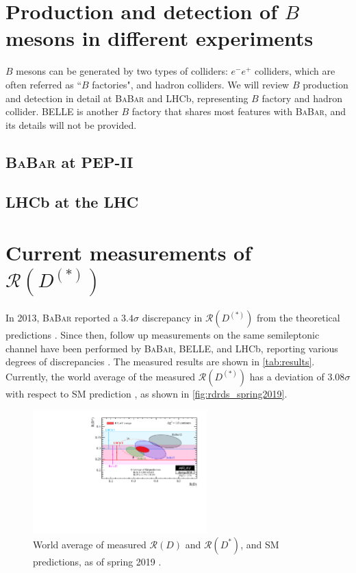 \documentclass[12pt,letterpaper]{article}
\def\BaBar/{\textsc{BaBar}}
\def\RD/{\ensuremath{\mathcal{R}(D)}}
\def\RDst/{\ensuremath{\mathcal{R}(D^{*})}}
\def\RDDst/{\ensuremath{\mathcal{R}(D^{(*)})}}
\begin{document}
\section{Production and detection of $B$ mesons in different experiments}
$B$ mesons can be generated by two types of colliders:
$e^- e^+$ colliders, which are often referred as ``$B$ factories", and hadron colliders.
We will review $B$ production and detection in detail at \BaBar/ and LHCb, representing $B$ factory and hadron collider.
BELLE is another $B$ factory that shares most features with \BaBar/, and its details will not be provided.

\subsection{\BaBar/ at PEP-II} \label{sec:babar}


\subsection{LHCb at the LHC} \label{sec:lhcb}


\section{Current measurements of \RDDst/}
In 2013, \BaBar/ reported a $3.4\sigma$ discrepancy in \RDDst/ from the
theoretical predictions \cite{Lees:2013rw}.
Since then, follow up measurements on the same semileptonic channel have been
performed by \BaBar/, BELLE, and LHCb, reporting various degrees of
discrepancies \cite{Hirose:2017185, LHCb:PhysRevLett.115.111803, Aaij:2017deq}.
The measured results are shown in \autoref{tab:results}.
Currently, the world average of the measured \RDDst/ has a deviation of
$3.08\sigma$ with respect to SM prediction \cite{HFLAV:2019}, as shown
in \autoref{fig:rdrds_spring2019}.

\begin{figure}[ht]
    \centering
    \includegraphics[width=0.6\textwidth]{figs/rdrds_spring2019.pdf}
    \caption{
        World average of measured \RD/ and \RDst/, and SM predictions, as of
        spring 2019 \cite{HFLAV:2019}.
    }
    \label{fig:rdrds_spring2019}
\end{figure}
\end{document}
